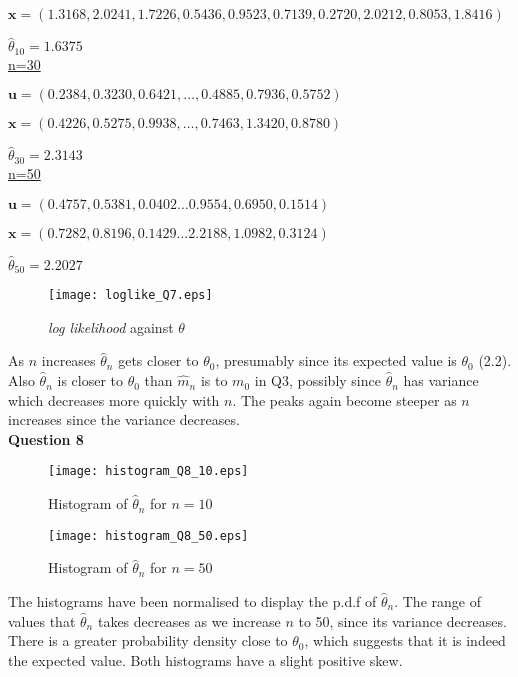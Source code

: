 \documentclass[12pt]{extarticle}
\begin{document}
$\textbf{x} = (1.3168,2.0241,1.7226,0.5436,0.9523, 0.7139,0.2720 ,2.0212 ,0.8053 ,1.8416)$

$\hat{\theta}_{10} = 1.6375$\\

\underline{n=30}

$\textbf{u} = (0.2384,
    0.3230,
    0.6421,
    \ldots,
    0.4885,
    0.7936,
    0.5752)$

$\textbf{x} = (0.4226,
   0.5275,
   0.9938,
   \ldots,
   0.7463,
   1.3420,
   0.8780)$

$\hat{\theta}_{30} = 2.3143$\\

\underline{n=50}

$\textbf{u} = (0.4757,
    0.5381,
    0.0402
    \ldots
    0.9554,
    0.6950,
    0.1514)$

$\textbf{x} = (0.7282,
    0.8196,
    0.1429
    \ldots
    2.2188,
    1.0982,
    0.3124)$

$\hat{\theta}_{50} =2.2027$

\begin{figure}[htp!]
\centering
\texttt{[image: loglike\_Q7.eps]}\\
\caption{\textit{log likelihood} against $\theta$}
\label{figure:3}
\end{figure}

As $n$ increases $\widehat{\theta}_n$ gets closer to $\theta_0$, presumably since its expected value is $\theta_0$ (2.2). Also $\widehat{\theta}_n$ is closer to $\theta_0$ than $\widehat{m}_n$ is to $m_0$ in Q3, possibly since $\widehat{\theta}_n$ has variance which decreases more quickly with $n$. The peaks again become steeper as $n$ increases since the variance decreases. \\

\textbf{Question 8}

\begin{figure}[htp!]
\centering
\texttt{[image: histogram\_Q8\_10.eps]}\\
\caption{Histogram of $\widehat{\theta}_n$ for $n=10$}
\label{figure:4}
\end{figure}

\begin{figure}[htp!]
\centering
\texttt{[image: histogram\_Q8\_50.eps]}\\
\caption{Histogram of $\widehat{\theta}_n$ for $n=50$}
\label{figure:5}
\end{figure}

The histograms have been normalised to display the p.d.f of $\widehat{\theta}_n$. The range of values that $\widehat{\theta}_n$ takes decreases as we increase $n$ to 50, since its variance decreases. There is a greater probability density close to $\theta_0$, which suggests that it is indeed the expected value. Both histograms have a slight positive skew.\\
\end{document}
